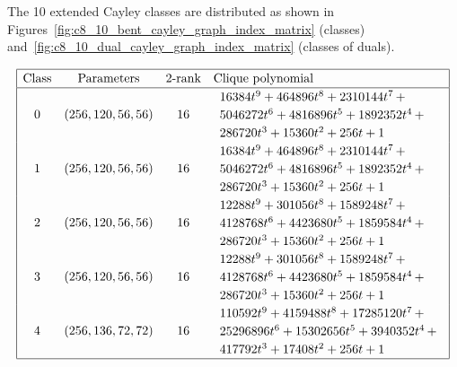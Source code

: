 \documentclass[12pt,a4paper]{article}
\begin{document}
The 10 extended Cayley classes are distributed
as shown in Figures~\ref{fig:c8_10_bent_cayley_graph_index_matrix} (classes) and~\ref{fig:c8_10_dual_cayley_graph_index_matrix}
(classes of duals).
\begin{table}[!bhpt] %
\small{}
\begin{align*}
\def\arraystretch{1.2}
\begin{array}{|cccl|}
\hline
\text{Class} &
\text{Parameters} &
\text{2-rank} &
\text{Clique polynomial}
\\
\hline
0 &
(256, 120, 56, 56) &
16 &
\begin{array}{l}
16384t^{9} + 464896t^{8} + 2310144t^{7}
\,+
\\
 5046272t^{6} + 4816896t^{5} + 1892352t^{4}
\,+
\\
 286720t^{3} + 15360t^{2} + 256t + 1
\end{array}
\\
1 &
(256, 120, 56, 56) &
16 &
\begin{array}{l}
16384t^{9} + 464896t^{8} + 2310144t^{7}
\,+
\\
 5046272t^{6} + 4816896t^{5} + 1892352t^{4}
\,+
\\
 286720t^{3} + 15360t^{2} + 256t + 1
\end{array}
\\
2 &
(256, 120, 56, 56) &
16 &
\begin{array}{l}
12288t^{9} + 301056t^{8} + 1589248t^{7}
\,+
\\
 4128768t^{6} + 4423680t^{5} + 1859584t^{4}
\,+
\\
 286720t^{3} + 15360t^{2} + 256t + 1
\end{array}
\\
3 &
(256, 120, 56, 56) &
16 &
\begin{array}{l}
12288t^{9} + 301056t^{8} + 1589248t^{7}
\,+
\\
 4128768t^{6} + 4423680t^{5} + 1859584t^{4}
\,+
\\
 286720t^{3} + 15360t^{2} + 256t + 1
\end{array}
\\
4 &
(256, 136, 72, 72) &
16 &
\begin{array}{l}
110592t^{9} + 4159488t^{8} + 17285120t^{7}
\,+
\\
 25296896t^{6} + 15302656t^{5} + 3940352t^{4}
\,+
\\
 417792t^{3} + 17408t^{2} + 256t + 1
\end{array}
\\
\hline
\end{array}
\end{align*}
\caption{$[f_{8,10}]$ extended Cayley classes (part 1).}
\label{tab-c8_10_EC_classes}
\end{table}
\end{document}
